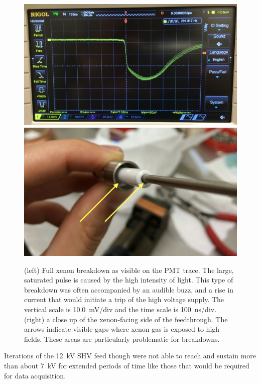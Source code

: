 \begin{figure}[htbp]
\begin{center}
\includegraphics[width=\halffig]{figures/testbed/breakdown.jpg}
\includegraphics[width=\halffig]{figures/testbed/ft_1and2_gasgaps.png}
\caption{(left) Full xenon breakdown as visible on the \acs{PMT} trace. The large, saturated pulse is caused by the high intensity of light. This type of breakdown was often accompanied by an audible buzz, and a rise in current that would initiate a trip of the high voltage supply. The vertical scale is 10.0~mV/div and the time scale is 100~ns/div. (right) a close up of the xenon-facing side of the feedthrough. The arrows indicate visible gaps where xenon gas is exposed to high fields. These areas are particularly problematic for breakdowns.}
\label{fig:breakdown}
\end{center}
\end{figure}

Iterations of the 12~kV \ac{SHV} feed though were not able to reach and sustain more than about 7~kV for extended periods of time like those that would be required for data acquisition.

